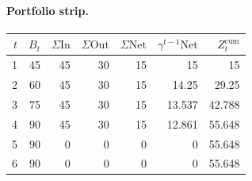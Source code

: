 \documentclass[12pt, a4paper]{article}
\begin{document}
\paragraph{Portfolio strip.}
\begin{center}
\begin{tabular}{rrrrrrr}
\toprule
$t$ & $B_t$ & $\Sigma\mathrm{In}$ & $\Sigma\mathrm{Out}$ & $\Sigma\mathrm{Net}$ & $\gamma^{t-1}\mathrm{Net}$ & $Z_t^{\mathrm{cum}}$\\
\midrule
1 & 45 & 45 & 30 & 15 & 15 & 15 \\
2 & 60 & 45 & 30 & 15 & 14.25 & 29.25 \\
3 & 75 & 45 & 30 & 15 & 13.537 & 42.788 \\
4 & 90 & 45 & 30 & 15 & 12.861 & 55.648 \\
5 & 90 & 0 & 0 & 0 & 0 & 55.648 \\
6 & 90 & 0 & 0 & 0 & 0 & 55.648 \\
\bottomrule
\end{tabular}
\end{center}
\end{document}
